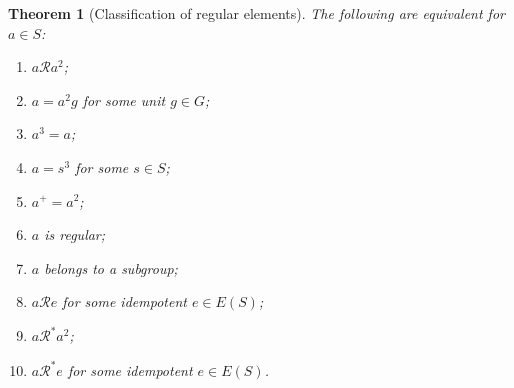 \documentclass[a4paper, 11pt]{article}
\theoremstyle{plain}
\newtheorem{theorem}{Theorem}[section]
\theoremstyle{definition}
\begin{document}
\begin{theorem}[Classification of regular elements]     \label{theorem:classification_regular_elements}
The following are equivalent for $a \in S$:
\begin{enumerate}
    \item \label{item:regular_aRa2} $a \mathcal{R} a^2$;

    \item \label{item:regular_a2g} $a = a^2 g$ for some unit $g \in G$;

    \item \label{item:regular_a3=a} $a^3 = a$;

    \item \label{item:regular_a=s3} $a = s^3$ for some $s \in S$;

    \item \label{item:regular_a0=sigma} $a^+ = a^2$;

    \item \label{item:regular} $a$ is regular;

    \item \label{item:regular_a_subgroup} $a$ belongs to a subgroup;

    \item \label{item:regular_aRe} $a \mathcal{R} e$ for some idempotent $e \in E(S)$;

    \item \label{item:regular_aRstara2} $a \mathcal{R}^* a^2$;
    
    \item \label{item:regular_aRstare} $a \mathcal{R}^* e$ for some idempotent $e \in E(S)$.
\end{enumerate}
\end{theorem}
\end{document}
